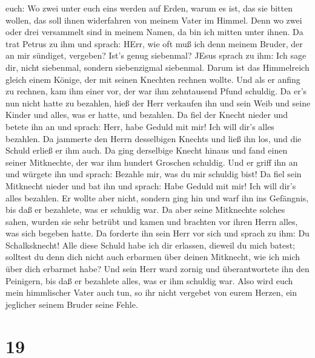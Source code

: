 euch: Wo zwei unter euch eins werden auf Erden, warum es ist, das sie
bitten wollen, das soll ihnen widerfahren von meinem Vater im Himmel.
 Denn wo zwei oder drei versammelt sind in meinem Namen, da
bin ich mitten unter ihnen.  Da trat Petrus zu ihm und
sprach: HErr, wie oft muß ich denn meinem Bruder, der an mir sündiget,
vergeben? Ist's genug siebenmal?  JEsus sprach zu ihm: Ich
sage dir, nicht siebenmal, sondern siebenzigmal siebenmal. 
Darum ist das Himmelreich gleich einem Könige, der mit seinen Knechten
rechnen wollte.  Und als er anfing zu rechnen, kam ihm
einer vor, der war ihm zehntausend Pfund schuldig.  Da er's
nun nicht hatte zu bezahlen, hieß der Herr verkaufen ihn und sein Weib
und seine Kinder und alles, was er hatte, und bezahlen.  Da
fiel der Knecht nieder und betete ihn an und sprach: Herr, habe Geduld
mit mir! Ich will dir's alles bezahlen.  Da jammerte den
Herrn desselbigen Knechts und ließ ihn los, und die Schuld erließ er ihm
auch.  Da ging derselbige Knecht hinaus und fand einen
seiner Mitknechte, der war ihm hundert Groschen schuldig. Und er griff
ihn an und würgete ihn und sprach: Bezahle mir, was du mir schuldig
bist!  Da fiel sein Mitknecht nieder und bat ihn und
sprach: Habe Geduld mit mir! Ich will dir's alles bezahlen.
 Er wollte aber nicht, sondern ging hin und warf ihn ins
Gefängnis, bis daß er bezahlete, was er schuldig war.  Da
aber seine Mitknechte solches sahen, wurden sie sehr betrübt und kamen
und brachten vor ihren Herrn alles, was sich begeben hatte.
 Da forderte ihn sein Herr vor sich und sprach zu ihm: Du
Schalksknecht! Alle diese Schuld habe ich dir erlassen, dieweil du mich
batest;  solltest du denn dich nicht auch erbarmen über
deinen Mitknecht, wie ich mich über dich erbarmet habe? 
Und sein Herr ward zornig und überantwortete ihn den Peinigern, bis daß
er bezahlete alles, was er ihm schuldig war.  Also wird
euch mein himmlischer Vater auch tun, so ihr nicht vergebet von eurem
Herzen, ein jeglicher seinem Bruder seine Fehle.

\hypertarget{section-18}{%
\section{19}\label{section-18}}

